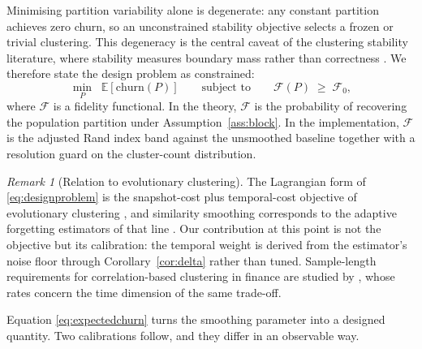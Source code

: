 \documentclass{rQUF2e}
\theoremstyle{plain}
\theoremstyle{remark}
\newtheorem{remark}{Remark}
\newcommand{\E}{\mathbb{E}}
\begin{document}
Minimising partition variability alone is degenerate: any constant partition
achieves zero churn, so an unconstrained stability objective selects a frozen
or trivial clustering. This degeneracy is the central caveat of the clustering
stability literature, where stability measures boundary mass rather than
correctness \citep{bendavid2006sober, vonluxburg2010clustering}. We therefore
state the design problem as constrained:
\begin{equation}
\min_{P} \;\; \E\!\left[\text{churn}(P)\right]
\qquad \text{subject to} \qquad
\mathcal{F}(P) \;\geq\; \mathcal{F}_0,
\label{eq:designproblem}
\end{equation}
where $\mathcal{F}$ is a fidelity functional. In the theory, $\mathcal{F}$ is
the probability of recovering the population partition under
Assumption~\ref{ass:block}. In the implementation, $\mathcal{F}$ is the
adjusted Rand index band against the unsmoothed baseline together with a
resolution guard on the cluster-count distribution.

\begin{remark}[Relation to evolutionary clustering]
\label{rem:evolutionary}
The Lagrangian form of \eqref{eq:designproblem} is the snapshot-cost plus
temporal-cost objective of evolutionary clustering
\citep{chakrabarti2006evolutionary}, and similarity smoothing corresponds to
the adaptive forgetting estimators of that line \citep{xu2014adaptive}. Our
contribution at this point is not the objective but its calibration: the
temporal weight is derived from the estimator's noise floor through
Corollary~\ref{cor:delta} rather than tuned. Sample-length requirements for
correlation-based clustering in finance are studied by
\citet{marti2016clustering}, whose rates concern the time dimension of the
same trade-off.
\end{remark}

Equation \eqref{eq:expectedchurn} turns the smoothing parameter into a designed
quantity. Two calibrations follow, and they differ in an observable way.
\end{document}
